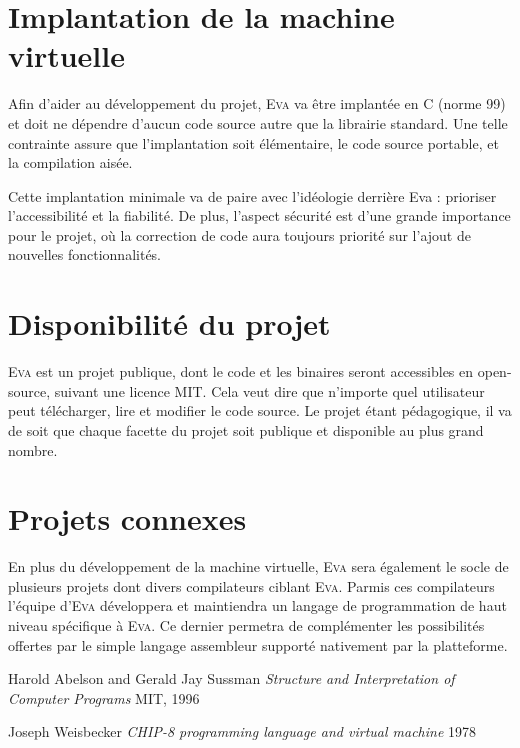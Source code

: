 \documentclass[11pt,twoside,french]{article}
\newcommand{\noun}[1]{\textsc{#1}}
\begin{document}
\section{Implantation de la machine virtuelle}

Afin d'aider au développement du projet, \noun{Eva} va être implantée
en C (norme 99) et doit ne dépendre d'aucun code source autre que
la librairie standard. Une telle contrainte assure que l'implantation
soit élémentaire, le code source portable, et la compilation aisée.

Cette implantation minimale va de paire avec l'idéologie derrière
Eva : prioriser l'accessibilité et la fiabilité. De plus, l'aspect
sécurité est d'une grande importance pour le projet, où la correction
de code aura toujours priorité sur l'ajout de nouvelles fonctionnalités.

\section{Disponibilité du projet}

\noun{Eva} est un projet publique, dont le code et les binaires seront
accessibles en open-source, suivant une licence MIT. Cela veut dire
que n'importe quel utilisateur peut télécharger, lire et modifier
le code source. Le projet étant pédagogique, il va de soit que chaque
facette du projet soit publique et disponible au plus grand nombre.

\section{Projets connexes}

En plus du développement de la machine virtuelle, \noun{Eva} sera
également le socle de plusieurs projets dont divers compilateurs ciblant
\noun{Eva}. Parmis ces compilateurs l'équipe d'\noun{Eva} développera et maintiendra
un langage de programmation de haut niveau spécifique à \noun{Eva}. Ce dernier
permetra de complémenter les possibilités offertes par le simple langage
assembleur supporté nativement par la platteforme.


\newpage{}

\begin{thebibliography}{XXXXXX}
\label{chap:bib}

 Harold Abelson and Gerald Jay Sussman
\emph{Structure and Interpretation of Computer Programs} MIT, 1996

 Joseph Weisbecker
\emph{CHIP-8 programming language and virtual machine} 1978

\end{thebibliography}
\end{document}

